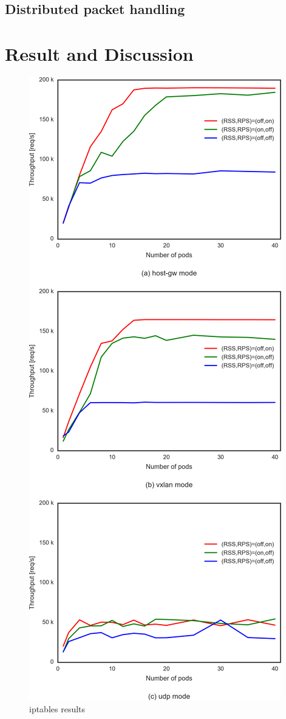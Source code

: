 \subsection{Distributed packet handling}
\section{Result and Discussion}

\begin{figure}
\includegraphics[width=\textwidth]{Figs/iptables_3figs}
\caption{iptables results}
\label{fig:iptabls3figs}
\end{figure}

